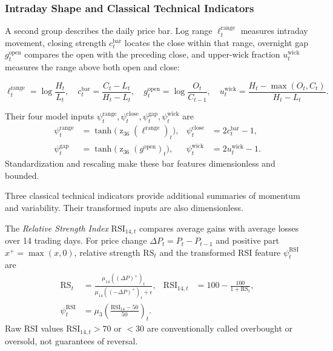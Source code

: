 \subsubsection{Intraday Shape and Classical Technical Indicators}

A second group describes the daily price bar. Log range \(\ell_t^{\mathrm{range}}\) measures intraday movement, closing strength \(c_t^{\mathrm{bar}}\) locates the close within that range, overnight gap \(g_t^{\mathrm{open}}\) compares the open with the preceding close, and upper-wick fraction \(u_t^{\mathrm{wick}}\) measures the range above both open and close:

\begin{equation}
\ell_t^{\mathrm{range}}=\log\frac{H_t}{L_t},\quad
c_t^{\mathrm{bar}}=\frac{C_t-L_t}{H_t-L_t},\quad
g_t^{\mathrm{open}}=\log\frac{O_t}{C_{t-1}},\quad
u_t^{\mathrm{wick}}=\frac{H_t-\max(O_t,C_t)}{H_t-L_t}.
\label{eq:feature-bars-raw}
\end{equation}

Their four model inputs \(\psi_t^{\mathrm{range}},\psi_t^{\mathrm{close}},\psi_t^{\mathrm{gap}},\psi_t^{\mathrm{wick}}\) are
\begin{equation}
\begin{aligned}
\psi_t^{\mathrm{range}}&=\tanh\!\big(\operatorname z_{36}(\ell^{\mathrm{range}})_t\big),
&\psi_t^{\mathrm{close}}&=2c_t^{\mathrm{bar}}-1,\\
\psi_t^{\mathrm{gap}}&=\tanh\!\big(\operatorname z_{36}(g^{\mathrm{open}})_t\big),
&\psi_t^{\mathrm{wick}}&=2u_t^{\mathrm{wick}}-1.
\end{aligned}
\label{eq:feature-bars}
\end{equation}
Standardization and rescaling make these bar features dimensionless and bounded.

Three classical technical indicators provide additional summaries of momentum and variability. Their transformed inputs are also dimensionless.

The \emph{Relative Strength Index} \(\mathrm{RSI}_{14,t}\) compares average gains with average losses over 14 trading days. For price change \(\Delta P_t=P_t-P_{t-1}\) and positive part \(x^+=\max(x,0)\), relative strength \(\mathrm{RS}_t\) and the transformed RSI feature \(\psi_t^{\mathrm{RSI}}\) are
\begin{equation}
\begin{aligned}
\mathrm{RS}_t&=\frac{\mu_{14}((\Delta P)^+)_t}{\mu_{14}((-\Delta P)^+)_t+\epsilon},
&\mathrm{RSI}_{14,t}&=100-\frac{100}{1+\mathrm{RS}_t},\\
\psi_t^{\mathrm{RSI}}&=\mu_3\!\left(\frac{\mathrm{RSI}_{14}-50}{50}\right)_t.
\end{aligned}
\label{eq:feature-rsi}
\end{equation}
Raw RSI values \(\mathrm{RSI}_{14,t}>70\) or \(<30\) are conventionally called overbought or oversold, not guarantees of reversal.

